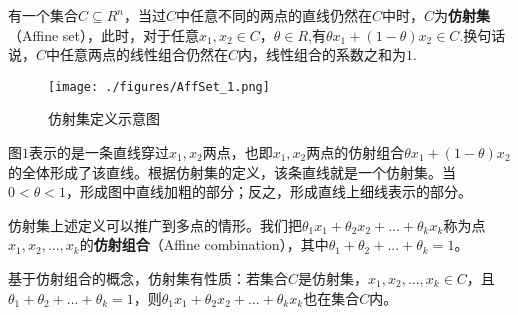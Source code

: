 
有一个集合$C \subseteq R^n$，当过$C$中任意不同的两点的直线仍然在$C$中时，$C$为\textbf{仿射集}（Affine set），此时，对于任意$x_1,x_2 \in C$，$\theta \in R$,有$\theta x_1+(1-\theta)x_2 \in C$.换句话说，$C$中任意两点的线性组合仍然在$C$内，线性组合的系数之和为$1$.

\begin{figure}[ht]
\centering
\texttt{[image: ./figures/AffSet\_1.png]}
\caption{仿射集定义示意图} \label{AffSet_fig1}
\end{figure}

图$1$表示的是一条直线穿过$x_1,x_2$两点，也即$x_1,x_2$两点的仿射组合$\theta x_1+(1-\theta)x_2$的全体形成了该直线。根据仿射集的定义，该条直线就是一个仿射集。当$0<\theta<1$，形成图中直线加粗的部分；反之，形成直线上细线表示的部分。

仿射集上述定义可以推广到多点的情形。我们把$\theta_1x_1+\theta_2x_2+...+\theta_kx_k$称为点$x_1,x_2,...,x_k$的\textbf{仿射组合}（Affine combination），其中$\theta_1+\theta_2+...+\theta_k=1$。

基于仿射组合的概念，仿射集有性质：若集合$C$是仿射集，$x_1,x_2,...,x_k \in C$，且$\theta_1+\theta_2+...+\theta_k=1$，则$\theta_1x_1+\theta_2x_2+...+\theta_kx_k$也在集合$C$内。